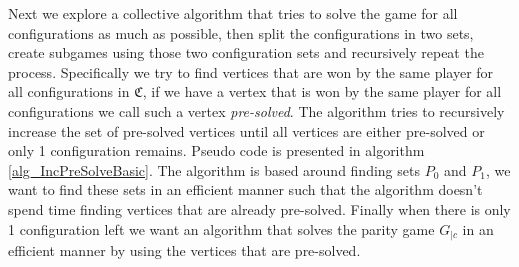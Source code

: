 Next we explore a collective algorithm that tries to solve the game for all configurations as much as possible, then split the configurations in two sets, create subgames using those two configuration sets and recursively repeat the process. Specifically we try to find vertices that are won by the same player for all configurations in $\mathfrak{C}$, if we have a vertex that is won by the same player for all configurations we call such a vertex \textit{pre-solved}. The algorithm tries to recursively increase the set of pre-solved vertices until all vertices are either pre-solved or only 1 configuration remains. Pseudo code is presented in algorithm \ref{alg_IncPreSolveBasic}. The algorithm is based around finding sets $P_0$ and $P_1$, we want to find these sets in an efficient manner such that the algorithm doesn't spend time finding vertices that are already pre-solved. Finally when there is only 1 configuration left we want an algorithm that solves the parity game $G_{|c}$ in an efficient manner by using the vertices that are pre-solved.

